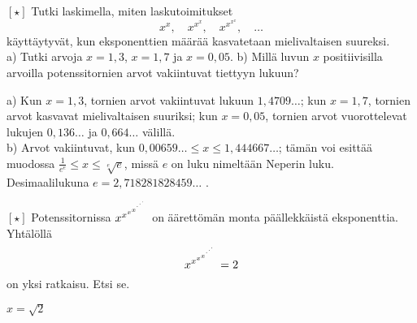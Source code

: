 \begin{tehtava}
$\boldsymbol{[\star]}$ Tutki laskimella, miten laskutoimitukset
\[ x^x, \quad x^{x^x}, \quad x^{x^{x^x}}, \quad \ldots \] 
käyttäytyvät, kun eksponenttien määrää kasvatetaan mielivaltaisen
suureksi.\\
a) Tutki arvoja $x=1,3$, $x=1,7$ ja $x=0,05$.
b) Millä luvun $x$ positiivisilla arvoilla potenssitornien arvot
vakiintuvat tiettyyn lukuun?
\begin{vastaus}
a) Kun $x = 1,3$, tornien arvot vakiintuvat lukuun $1,4709\ldots$;
kun $x = 1,7$, tornien arvot kasvavat mielivaltaisen suuriksi;
kun $x=0,05$, tornien arvot vuorottelevat lukujen $0,136\ldots$
ja $0,664\ldots$ välillä. \\
b) Arvot vakiintuvat, kun $0,00659 \ldots \leq x \leq 1,444667\ldots$;
tämän voi esittää muodossa $\frac{1}{e^e} \leq x \leq \sqrt[e]{e}$, missä
$e$ on luku nimeltään Neperin luku. Desimaalilukuna $e = 2,718281828459 \ldots$ .
\end{vastaus}
\end{tehtava}
\begin{tehtava}
$\boldsymbol{[\star]}$ Potenssitornissa $x^{x^{x^{x^{\mathstrut^{.^{.^{.}}}}}}} $
on äärettömän monta päällekkäistä eksponenttia. Yhtälöllä
\[ x^{x^{x^{x^{\mathstrut^{.^{.^{.}}}}}}} =2\]
on yksi ratkaisu. Etsi se.
\begin{vastaus}
$x = \sqrt{2}$
\end{vastaus}
\end{tehtava}

